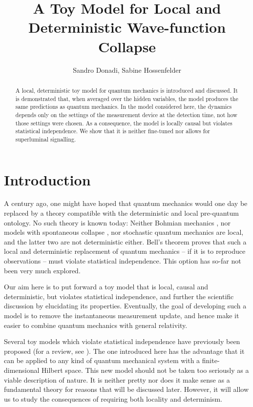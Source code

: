 \documentclass[12pt]{article}
\begin{document}
\title{A Toy Model for Local and Deterministic Wave-function Collapse}
\author{Sandro Donadi, Sabine Hossenfelder}
\date{}
\maketitle
\vspace*{-1cm}


\begin{abstract}
A local, deterministic toy model for quantum mechanics is introduced and discussed. It
is demonstrated that, when averaged
over the hidden variables, the model produces the same predictions as quantum mechanics. In the model considered here, the dynamics depends only on the settings of the measurement device at the detection time, not how those settings were chosen. As a consequence, the model is locally causal but violates statistical independence. We show that it is neither fine-tuned nor allows for superluminal signalling. 
\end{abstract}

\section{Introduction} 
 
A century ago, one might have hoped that quantum mechanics would one day be replaced by a theory compatible with the deterministic and local pre-quantum ontology. No such theory is known today: Neither Bohmian mechanics \cite{Bohm}, nor models with spontaneous collapse \cite{GRW, Bassi:2003gd}, nor stochastic quantum mechanics \cite{Nelson} are local, and the latter two are not deterministic either. 
Bell's theorem \cite{Bell} proves that such a local and deterministic replacement of quantum mechanics -- if it is to reproduce observations -- must violate statistical independence. This option has so-far not been very much explored. 

Our aim here is to put forward a toy model that is local, causal and deterministic, but violates statistical independence, and further the scientific discussion by elucidating its properties. Eventually, the goal of developing such a model is to remove the instantaneous measurement update, and hence make it easier to combine quantum mechanics with general relativity.

Several toy models which violate statistical independence
have previously been proposed \cite{brans,Palmer:1995mxd,degorre,Palmer:2009mxd,Hall3,Sudarsky} (for a review, see \cite{Hall}). The one introduced here has the advantage
that it can be applied to any kind of quantum mechanical system with a finite-dimensional Hilbert space. This new model should not be taken too seriously as a viable description of nature. It is neither pretty nor does it make sense as a fundamental theory for reasons that will be discussed later. However, it will allow us to study the consequences of requiring both locality and determinism.
\end{document}
